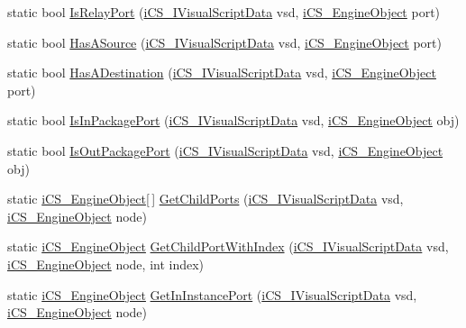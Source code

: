 \begin{DoxyCompactItemize}
\item 
static bool \hyperlink{classi_c_s___visual_script_data_a74da32dab86fec8b4adb54770d30b116}{Is\+Relay\+Port} (\hyperlink{interfacei_c_s___i_visual_script_data}{i\+C\+S\+\_\+\+I\+Visual\+Script\+Data} vsd, \hyperlink{classi_c_s___engine_object}{i\+C\+S\+\_\+\+Engine\+Object} port)
\item 
static bool \hyperlink{classi_c_s___visual_script_data_ac001865b51c1037ae0fbd690c9e9fa89}{Has\+A\+Source} (\hyperlink{interfacei_c_s___i_visual_script_data}{i\+C\+S\+\_\+\+I\+Visual\+Script\+Data} vsd, \hyperlink{classi_c_s___engine_object}{i\+C\+S\+\_\+\+Engine\+Object} port)
\item 
static bool \hyperlink{classi_c_s___visual_script_data_ac1b1f5968ca1c527f6e0e6efb92ffaf2}{Has\+A\+Destination} (\hyperlink{interfacei_c_s___i_visual_script_data}{i\+C\+S\+\_\+\+I\+Visual\+Script\+Data} vsd, \hyperlink{classi_c_s___engine_object}{i\+C\+S\+\_\+\+Engine\+Object} port)
\item 
static bool \hyperlink{classi_c_s___visual_script_data_ab40de88966886b1b3025278038029bee}{Is\+In\+Package\+Port} (\hyperlink{interfacei_c_s___i_visual_script_data}{i\+C\+S\+\_\+\+I\+Visual\+Script\+Data} vsd, \hyperlink{classi_c_s___engine_object}{i\+C\+S\+\_\+\+Engine\+Object} obj)
\item 
static bool \hyperlink{classi_c_s___visual_script_data_abd51ef34a5541ae6f46fb360f5fbef8d}{Is\+Out\+Package\+Port} (\hyperlink{interfacei_c_s___i_visual_script_data}{i\+C\+S\+\_\+\+I\+Visual\+Script\+Data} vsd, \hyperlink{classi_c_s___engine_object}{i\+C\+S\+\_\+\+Engine\+Object} obj)
\item 
static \hyperlink{classi_c_s___engine_object}{i\+C\+S\+\_\+\+Engine\+Object}\mbox{[}$\,$\mbox{]} \hyperlink{classi_c_s___visual_script_data_a0d46bd4ade8d72472c1c51a858e0e574}{Get\+Child\+Ports} (\hyperlink{interfacei_c_s___i_visual_script_data}{i\+C\+S\+\_\+\+I\+Visual\+Script\+Data} vsd, \hyperlink{classi_c_s___engine_object}{i\+C\+S\+\_\+\+Engine\+Object} node)
\item 
static \hyperlink{classi_c_s___engine_object}{i\+C\+S\+\_\+\+Engine\+Object} \hyperlink{classi_c_s___visual_script_data_ab30e35d5300e4646eb98e1002162324d}{Get\+Child\+Port\+With\+Index} (\hyperlink{interfacei_c_s___i_visual_script_data}{i\+C\+S\+\_\+\+I\+Visual\+Script\+Data} vsd, \hyperlink{classi_c_s___engine_object}{i\+C\+S\+\_\+\+Engine\+Object} node, int index)
\item 
static \hyperlink{classi_c_s___engine_object}{i\+C\+S\+\_\+\+Engine\+Object} \hyperlink{classi_c_s___visual_script_data_a1835da05f4342546ec140b498dc46d28}{Get\+In\+Instance\+Port} (\hyperlink{interfacei_c_s___i_visual_script_data}{i\+C\+S\+\_\+\+I\+Visual\+Script\+Data} vsd, \hyperlink{classi_c_s___engine_object}{i\+C\+S\+\_\+\+Engine\+Object} node)

\end{DoxyCompactItemize}
